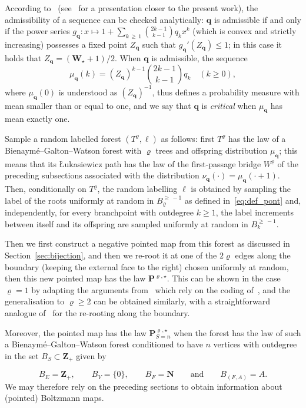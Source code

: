 \documentclass[AHL,Unicode,longabstracts,published]{cedram}
\newcommand{\ensembles}[1]{\mathbf{#1}}
\newcommand{\N}{\ensembles{N}}
\newcommand{\Z}{\ensembles{Z}}
\renewcommand{\P}{\ensembles{P}}
\newcommand{\1}{\ensembles{1}}
\newcommand{\q}{\mathbf{q}}
\newcommand{\bfW}{\mathbf{W}}
\renewcommand{\le}{\leqslant}
\renewcommand{\ge}{\geqslant}
\newcommand{\BBmap}{B}
\begin{document}
According to~\cite{MM07} (see~\cite{Mar18b} for a presentation closer to the present work), the admissibility of a sequence can be checked analytically: $\q$ is admissible if and only if the power series $g_\q : x \mapsto 1 + \sum_{k\,\ge\,1} \binom{2k-1}{k-1} q_k x^k$ (which is convex and strictly increasing) possesses a fixed point $Z_\q$ such that $g_\q'(Z_\q)\le1$; in this case it holds that $Z_\q = (\bfW_\star+1)/2$. When $\q$ is admissible, the sequence
\[
\mu_\q(k) = (Z_\q)^{k-1} \binom{2k-1}{k-1} q_k
\quad (k \ge 0),
\]
where $\mu_\q(0)$ is understood as $(Z_\q)^{-1}$, thus defines a probability measure with mean smaller than or equal to one, and we say that $\q$ is \emph{critical} when $\mu_\q$ has mean exactly one.

Sample a random labelled forest $(T^\varrho, \ell)$ as follows: first $T^\varrho$ has the law of a Bienaymé--Galton--Watson forest with $\varrho$ trees and offspring distribution $\mu_\q$; this means that its {\L}ukasiewicz path has the law of the first-passage bridge $W^\varrho$ of the preceding subsections associated with the distribution $\nu_\q(\cdot) = \mu_\q(\cdot+1)$. Then, conditionally on $T^\varrho$, the random labelling $\ell$ is obtained by sampling the label of the roots uniformly at random in $\BBmap_{\varrho}^{\ge\,-1}$ as defined in~\eqref{eq:def_pont} and, independently, for every branchpoint with outdegree $k \ge 1$, the label increments between itself and its offspring are sampled uniformly at random in $\BBmap_{k}^{\ge\,-1}$.

Then we first construct a negative pointed map from this forest as discussed in Section~\ref{sec:bijection}, and then we re-root it at one of the $2\varrho$ edges along the boundary (keeping the external face to the right) chosen uniformly at random, then this new pointed map has the law $\P^{\varrho, \star}$. This can be shown in the case $\varrho = 1$ by adapting the arguments from~\cite{MM07} which rely on the coding of~\cite{BDG04}, and the generalisation to $\varrho \ge 2$ can be obtained similarly, with a straightforward analogue of~\cite[Lemma~10]{BM17} for the re-rooting along the boundary.

Moreover, the pointed map has the law $\P^{\varrho, \star}_{S=n}$ when the forest has the law of such a Bienaymé--Galton--Watson forest conditioned to have $n$ vertices with outdegree in the set $B_S \subset \Z_+$ given by

\[
B_E = \Z_+,
\qquad B_V = \{0\},
\qquad B_F = \N
\qquad\text{and}\qquad B_{(F,A)} = A.
\]
We may therefore rely on the preceding sections to obtain information about (pointed) Boltzmann maps.
\end{document}
